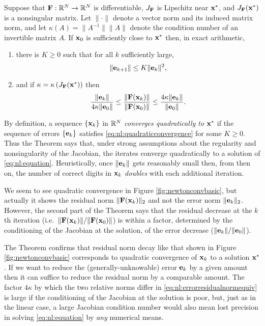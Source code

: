 \begin{theorem} \citep[Theorems 1.1 and inequalities (1.13)]{Kelley2003}
Suppose that $\mathbf{F}:\mathbb{R}^N\to\mathbb{R}^N$ is differentiable, $J_{\mathbf{F}}$ is Lipschitz near $\mathbf{x}^*$, and $J_{\mathbf{F}}(\mathbf{x}^*)$ is a nonsingular matrix.  Let $\|\cdot\|$ denote a vector norm and its induced matrix norm, and let $\kappa(A)=\|A^{-1}\| \|A\|$ denote the condition number of an invertible matrix $A$.  If $\mathbf{x}_0$ is sufficiently close to $\mathbf{x}^*$ then, in exact arithmetic,
\renewcommand{\labelenumi}{(\roman{enumi})}
\begin{enumerate}
\item there is $K\ge 0$ such that for all $k$ sufficiently large,
\begin{equation}
	\|\mathbf{e}_{k+1}\| \le K \|\mathbf{e}_k\|^2, \label{eq:nl:quadraticconvergence}
\end{equation}
\item and if $\kappa = \kappa\left(J_{\mathbf{F}}(\mathbf{x}^*)\right)$ then
\begin{equation}
	\frac{\|\mathbf{e}_k\|}{4 \kappa \|\mathbf{e}_0\|} \le \frac{\|\mathbf{F}(\mathbf{x}_k)\|}{\|\mathbf{F}(\mathbf{x}_0)\|} \le \frac{4 \kappa \|\mathbf{e}_k\|}{\|\mathbf{e}_0\|}. \label{eq:nl:errorresidualnormequiv}
\end{equation}
\end{enumerate}
\end{theorem}

\medskip
By definition, a sequence $\{\mathbf{x}_k\}$ in $\mathbb{R}^N$ \emph{converges quadratically to} $\mathbf{x}^*$ if the sequence of errors $\{\mathbf{e}_k\}$ satisfies \eqref{eq:nl:quadraticconvergence} for some $K\ge 0$.  Thus the Theorem says that, under strong assumptions about the regularity and nonsingularity of the Jacobian, the iterates converge quadratically to a solution of \eqref{eq:nl:equation}.  Heuristically, once $\|\mathbf{e}_k\|$ gets reasonably small then, from then on, the number of correct digits in $\mathbf{x}_k$ \emph{doubles} with each additional iteration.

We seem to see quadratic convergence in Figure \ref{fig:newtonconvbasic}, but actually it shows the residual norm $\|\mathbf{F}(\mathbf{x}_k)\|_2$ and not the error norm $\|\mathbf{e}_k\|_2$.  However, the second part of the Theorem says that the residual decrease at the $k$th iteration (i.e.~$\|\mathbf{F}(\mathbf{x}_k)\|/\|\mathbf{F}(\mathbf{x}_0)\|$) is within a factor, determined by the conditioning of the Jacobian at the solution, of the error decrease ($\|\mathbf{e}_k\|/\|\mathbf{e}_0\|$).

The Theorem confirms that residual norm decay like that shown in Figure \ref{fig:newtonconvbasic} corresponds to quadratic convergence of $\mathbf{x}_k$ to a solution $\mathbf{x}^*$.  If we want to reduce the (generally-unknowable) error $\mathbf{e}_k$ by a given amount then it can suffice to reduce the residual norm by a comparable amount.  The factor $4 \kappa$ by which the two relative norms differ in \eqref{eq:nl:errorresidualnormequiv} is large if the conditioning of the Jacobian at the solution is poor, but, just as in the linear case, a large Jacobian condition number would also mean lost precision in solving \eqref{eq:nl:equation} by \emph{any} numerical means.

